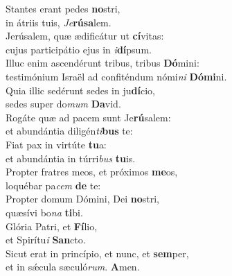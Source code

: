 \evenverse Stantes erant pedes \textbf{no}stri,~\*\\
\evenverse in átriis tuis, \textit{Je}\textbf{rú}\textbf{sa}lem.\\
\oddverse Jerúsalem, quæ ædificátur ut \textbf{cí}vitas:~\*\\
\oddverse cujus participátio ejus in \textit{i}\textbf{dí}psum.\\
\evenverse Illuc enim ascendérunt tribus, tribus \textbf{Dó}mini:~\*\\
\evenverse testimónium Israël ad confiténdum nómi\textit{ni} \textbf{Dó}\textbf{mi}ni.\\
\oddverse Quia illic sedérunt sedes in ju\textbf{dí}cio,~\*\\
\oddverse sedes super do\textit{mum} \textbf{Da}vid.\\
\evenverse Rogáte quæ ad pacem sunt Je\textbf{rú}salem:~\*\\
\evenverse et abundántia diligén\textit{ti}\textbf{bus} te:\\
\oddverse Fiat pax in virtúte \textbf{tu}a:~\*\\
\oddverse et abundántia in túrri\textit{bus} \textbf{tu}is.\\
\evenverse Propter fratres meos, et próximos \textbf{me}os,~\*\\
\evenverse loquébar pa\textit{cem} \textbf{de} te:\\
\oddverse Propter domum Dómini, Dei \textbf{no}stri,~\*\\
\oddverse quæsívi bo\textit{na} \textbf{ti}bi.\\
\evenverse Glória Patri, et \textbf{Fí}lio,~\*\\
\evenverse et Spirítu\textit{i} \textbf{San}cto.\\
\oddverse Sicut erat in princípio, et nunc, et \textbf{sem}per,~\*\\
\oddverse et in sǽcula sæculó\textit{rum}. \textbf{A}men.\\
